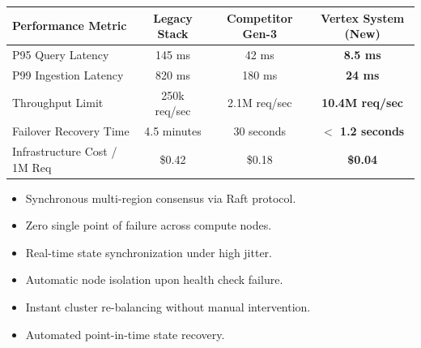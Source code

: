 \documentclass[landscape,20pt]{foils}
\begin{document}
\foilhead{\textcolor{NavyDark}{\faTable\ System Performance Comparison}}
\vspace{2pt}
\centering
\small
\renewcommand{\arraystretch}{1.2}
\begin{tabularx}{\textwidth}{X c c c}
  \toprule
  \textbf{Performance Metric} & \textbf{Legacy Stack} & \textbf{Competitor Gen-3} & \textbf{Vertex System (New)} \\
  \midrule
  P95 Query Latency & 145 ms & 42 ms & \textbf{8.5 ms} \\
  P99 Ingestion Latency & 820 ms & 180 ms & \textbf{24 ms} \\
  Throughput Limit & 250k req/sec & 2.1M req/sec & \textbf{10.4M req/sec} \\
  Failover Recovery Time & 4.5 minutes & 30 seconds & \textbf{$<$ 1.2 seconds} \\
  Infrastructure Cost / 1M Req & \$0.42 & \$0.18 & \textbf{\$0.04} \\
  \bottomrule
\end{tabularx}

\foilhead{\textcolor{NavyDark}{\faCheck\ Fault Tolerance \& High Availability}}
\vspace{2pt}
\begin{minipage}[t]{0.48\textwidth}
  \begin{tcolorbox}[slidecard, title=\large \faServer\ Active-Active Replication]
    \begin{itemize}
      \item Synchronous multi-region consensus via Raft protocol.
      \item Zero single point of failure across compute nodes.
      \item Real-time state synchronization under high jitter.
    \end{itemize}
  \end{tcolorbox}
\end{minipage}%
\hfill
\begin{minipage}[t]{0.48\textwidth}
  \begin{tcolorbox}[slidecard, title=\large \faCogs\ Self-Healing Infrastructure]
    \begin{itemize}
      \item Automatic node isolation upon health check failure.
      \item Instant cluster re-balancing without manual intervention.
      \item Automated point-in-time state recovery.
    \end{itemize}
  \end{tcolorbox}
\end{minipage}
\end{document}
